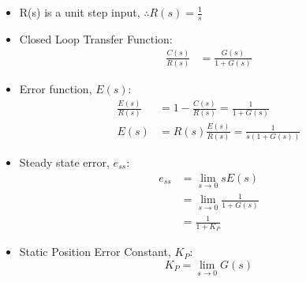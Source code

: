 \documentclass[a4paper]{article}
\begin{document}
\begin{itemize}
    \item R(s) is a unit step input, $\therefore R(s) = \displaystyle\frac{1}{s}$
    \item Closed Loop Transfer Function:
    \begin{align*}
        \frac{C(s)}{R(s)} &= \frac{G(s)}{1+G(s)}
    \end{align*}
    \item Error function, $E(s)$:
    \begin{align*}
        \frac{E(s)}{R(s)} &= 1-\frac{C(s)}{R(s)} = \frac{1}{1+G(s)}\\
        E(s) &= R(s)\frac{E(s)}{R(s)} = \frac{1}{s(1+G(s))}
    \end{align*}
    \item Steady state error, $e_{ss}$:
    \begin{align*}
        e_{ss} &= \lim_{s\to 0}sE(s)\\
        &= \lim_{s\to 0}\frac{1}{1+G(s)}\\
        &= \frac{1}{1+K_P}
    \end{align*}
    \item Static Position Error Constant, $K_P$:
    $$K_P = \lim_{s\to 0}G(s)$$
\end{itemize}
\end{document}
